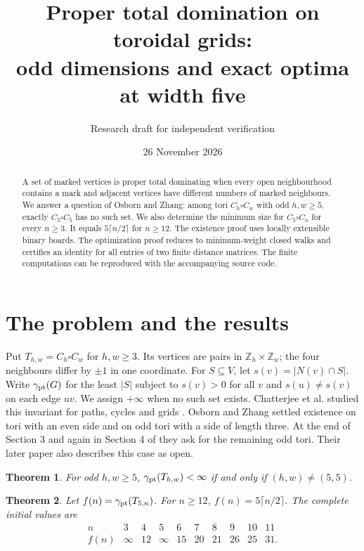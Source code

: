 \documentclass[11pt,a4paper]{article}
\title{Proper total domination on toroidal grids:\\odd dimensions and exact optima at width five}
\author{Research draft for independent verification}
\date{26 November 2026}
\newtheorem{theorem}{Theorem}
\newcommand{\pt}{\gamma_{\rm pt}}
\newcommand{\T}{T}
\begin{document}
\maketitle
\begin{abstract}
A set of marked vertices is proper total dominating when every open neighbourhood contains a mark and adjacent vertices have different numbers of marked neighbours. We answer a question of Osborn and Zhang: among tori $C_h\square C_w$ with odd $h,w\ge5$, exactly $C_5\square C_5$ has no such set. We also determine the minimum size for $C_5\square C_n$ for every $n\ge3$. It equals $5\lceil n/2\rceil$ for $n\ge12$. The existence proof uses locally extensible binary boards. The optimization proof reduces to minimum-weight closed walks and certifies an identity for all entries of two finite distance matrices. The finite computations can be reproduced with the accompanying source code.
\end{abstract}

\section{The problem and the results}
Put $\T_{h,w}=C_h\square C_w$ for $h,w\ge3$. Its vertices are pairs in $\mathbb Z_h\times\mathbb Z_w$; the four neighbours differ by $\pm1$ in one coordinate. For $S\subseteq V$, let $s(v)=|N(v)\cap S|$. Write $\pt(G)$ for the least $|S|$ subject to $s(v)>0$ for all $v$ and $s(u)\ne s(v)$ on each edge $uv$. We assign $+\infty$ when no such set exists. Chatterjee et al. studied this invariant for paths, cycles and grids \cite{intro}. Osborn and Zhang settled existence on tori with an even side and on odd tori with a side of length three. At the end of Section 3 and again in Section 4 of \cite{princes} they ask for the remaining odd tori. Their later paper \cite{fans} also describes this case as open.

\begin{theorem}\label{exists}
For odd $h,w\ge5$, $\pt(\T_{h,w})<\infty$ if and only if $(h,w)\ne(5,5)$.
\end{theorem}

\begin{theorem}\label{five}
Let $f(n)=\pt(\T_{5,n})$. For $n\ge12$, $f(n)=5\lceil n/2\rceil$. The complete initial values are
\[
\begin{array}{c|rrrrrrrrr}
 n&3&4&5&6&7&8&9&10&11\\ \hline
 f(n)&\infty&12&\infty&15&20&21&26&25&31 .
\end{array}
\]
\end{theorem}
\end{document}
